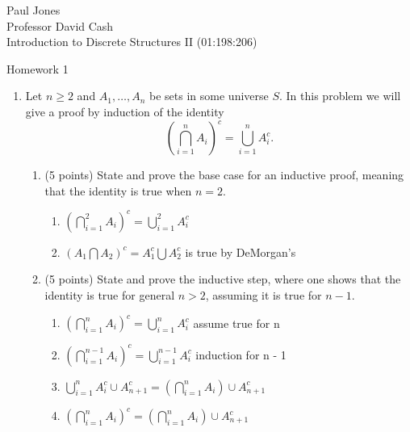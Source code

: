 \documentclass[11pt]{article}
\begin{document}
\sloppy

{
\noindent Paul Jones\\
Professor David Cash  \\
Introduction to Discrete Structures II (01:198:206) \\
\begin{center}
Homework 1
\end{center}
}

\begin{enumerate}


\item Let $n\geq 2$ and $A_1,\ldots,A_n$ be sets in some universe $S$.  In this
problem we will give a proof by induction of the identity
\[
\left(\bigcap_{i=1}^n A_i\right)^c = \bigcup_{i=1}^n A_i^c.
\]

\begin{enumerate}
\item (5 points)  State and prove the base case for an inductive proof, meaning
that the identity is true when $n=2$.

\begin{enumerate}

\item $\left(\bigcap_{i=1}^2 A_i\right)^c = \bigcup_{i=1}^2 A_i^c$
\item $ \left(A_1 \bigcap A_2 \right)^c = A_1^c \bigcup A_2^c$ is true by DeMorgan's

\end{enumerate}

\item (5 points)  State and prove the inductive step, where one shows that the 
identity is true for general $n>2$, assuming it is true for $n-1$.


\begin{enumerate}

\item $ \left(\bigcap_{i=1}^n A_i\right)^c = \bigcup_{i=1}^n A_i^c $ assume true for n
\item $ \left(\bigcap_{i=1}^{n - 1} A_i\right)^c = \bigcup_{i=1}^{n - 1} A_i^c $ induction for n - 1
\item $\bigcup_{i = 1}^n A_i^c \cup A_{n + 1}^c = \left( \bigcap_{i = 1}^n A_i \right) \cup A_{n + 1}^c$
\item $\left(\bigcap_{i=1}^n A_i\right)^c = \left( \bigcap_{i = 1}^n A_i \right) \cup A_{n + 1}^c$


\end{enumerate}
\end{enumerate}
\end{enumerate}
\end{document}
